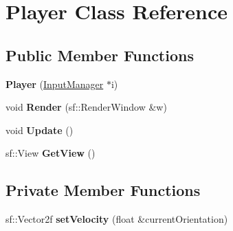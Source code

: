 \hypertarget{class_player}{}\section{Player Class Reference}
\label{class_player}
\subsection*{Public Member Functions}
\begin{DoxyCompactItemize}
\item 
\mbox{\label{class_player_aae7572a50fac01eb0b65bf6e178136a7}} 
{\bfseries Player} (\hyperlink{class_input_manager}{Input\+Manager} $\ast$i)
\item 
\mbox{\label{class_player_a2a30ed32ba5f2caad0e5cd6606e3cf69}} 
void {\bfseries Render} (sf\+::\+Render\+Window \&w)
\item 
\mbox{\label{class_player_a05b60cac1922c5be5c1be16baffa4497}} 
void {\bfseries Update} ()
\item 
\mbox{\label{class_player_a35e13e6d521eebd69310a703f8bdb4b9}} 
sf\+::\+View {\bfseries Get\+View} ()
\end{DoxyCompactItemize}
\subsection*{Private Member Functions}
\begin{DoxyCompactItemize}
\item 
\mbox{\label{class_player_a647d07ea4f4b56460be476a044431bba}} 
sf\+::\+Vector2f {\bfseries set\+Velocity} (float \&current\+Orientation)
\end{DoxyCompactItemize}
